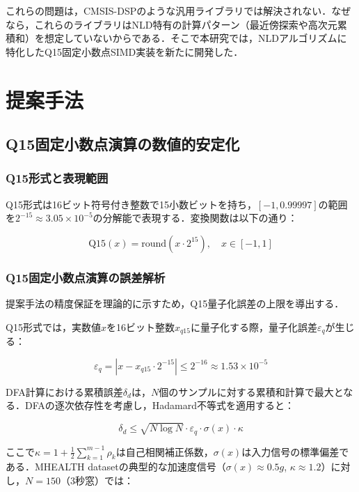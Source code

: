 \documentclass[paper]{ieice}
\begin{document}
これらの問題は，CMSIS-DSP\cite{arm2020}のような汎用ライブラリでは解決されない．なぜなら，これらのライブラリはNLD特有の計算パターン（最近傍探索や高次元累積和）を想定していないからである．そこで本研究では，NLDアルゴリズムに特化したQ15固定小数点SIMD実装を新たに開発した．

\section{提案手法}

\subsection{Q15固定小数点演算の数値的安定化}

\subsubsection{Q15形式と表現範囲}
Q15形式は16ビット符号付き整数で15小数ビットを持ち，$[-1, 0.99997]$の範囲を$2^{-15} \approx 3.05 \times 10^{-5}$の分解能で表現する．変換関数は以下の通り：

\begin{equation}
\text{Q15}(x) = \text{round}(x \cdot 2^{15}), \quad x \in [-1, 1]
\end{equation}

\subsubsection{Q15固定小数点演算の誤差解析}
提案手法の精度保証を理論的に示すため，Q15量子化誤差の上限を導出する．

Q15形式では，実数値$x$を16ビット整数$x_{q15}$に量子化する際，量子化誤差$\varepsilon_q$が生じる：

\begin{equation}
\varepsilon_q = |x - x_{q15} \cdot 2^{-15}| \leq 2^{-16} \approx 1.53 \times 10^{-5}
\end{equation}

DFA計算における累積誤差$\delta_d$は，$N$個のサンプルに対する累積和計算で最大となる．DFAの逐次依存性を考慮し，Hadamard不等式を適用すると：

\begin{equation}
\delta_d \leq \sqrt{N \log N} \cdot \varepsilon_q \cdot \sigma(x) \cdot \kappa
\end{equation}

ここで$\kappa = 1 + \frac{1}{2}\sum_{k=1}^{m-1}\rho_k$は自己相関補正係数，$\sigma(x)$は入力信号の標準偏差である．MHEALTH datasetの典型的な加速度信号（$\sigma(x) \approx 0.5g$, $\kappa \approx 1.2$）に対し，$N=150$（3秒窓）では：
\end{document}
